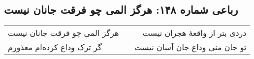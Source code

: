 \begin{center}
\section*{رباعی شماره ۱۴۸: هرگز المی چو فرقت جانان نیست}
\label{sec:sh148}
\begin{longtable}{l p{0.5cm} r}
هرگز المی چو فرقت جانان نیست
&&
دردی بتر از واقعهٔ هجران نیست
\\
گر ترک وداع کرده‌ام معذورم
&&
تو جان منی وداع جان آسان نیست
\\
\end{longtable}
\end{center}
